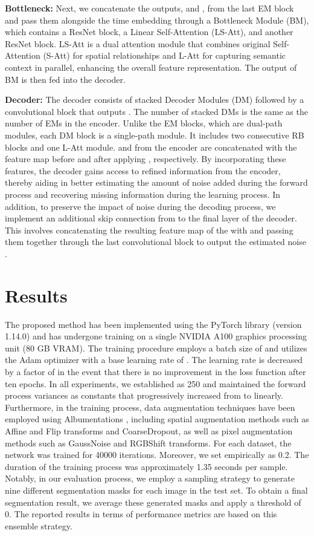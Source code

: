 \documentclass[runningheads]{llncs}
\begin{document}
\noindent\textbf{Bottleneck:} Next, we concatenate the outputs,  and , from the last EM block and pass them alongside the time embedding  through a Bottleneck Module (BM), which contains a ResNet block, a Linear Self-Attention (LS-Att), and another ResNet block. LS-Att is a dual attention module that combines original Self-Attention (S-Att) for spatial relationships and L-Att for capturing semantic context in parallel, enhancing the overall feature representation. The output of BM is then fed into the decoder.

\noindent\textbf{Decoder:} The decoder consists of stacked Decoder Modules (DM) followed by a convolutional block that outputs . The number of stacked DMs is the same as the number of EMs in the encoder. Unlike the EM blocks, which are dual-path modules, each DM block is a single-path module. It includes two consecutive RB blocks and one L-Att module.  and  from the encoder are concatenated with the feature map before and after applying , respectively. By incorporating these features, the decoder gains access to refined information from the encoder, thereby aiding in better estimating the amount of noise added during the forward process and recovering missing information during the learning process. In addition, to preserve the impact of noise during the decoding process, we implement an additional skip connection from  to the final layer of the decoder. This involves concatenating the resulting feature map of the  with  and passing them together through the last convolutional block to output the estimated noise .


\section{Results}
The proposed method has been implemented using the PyTorch library (version 1.14.0) and has undergone training on a single NVIDIA A100 graphics processing unit (80 GB VRAM). The training procedure employs a batch size of  and utilizes the Adam optimizer with a base learning rate of . The learning rate is decreased by a factor of  in the event that there is no improvement in the loss function after ten epochs. In all experiments, we established  as 250 and maintained the forward process variances as constants that progressively increased from  to  linearly. Furthermore, in the training process, data augmentation techniques have been employed using Albumentations \cite{info11020125}, including spatial augmentation methods such as Affine and Flip transforms and CoarseDropout, as well as pixel augmentation methods such as GaussNoise and RGBShift transforms. For each dataset, the network was trained for 40000 iterations. Moreover, we set  empirically as 0.2. The duration of the training process was approximately 1.35 seconds per sample. Notably, in our evaluation process, we employ a sampling strategy to generate nine different segmentation masks for each image in the test set. To obtain a final segmentation result, we average these generated masks and apply a threshold of 0. The reported results in terms of performance metrics are based on this ensemble strategy.
\end{document}
